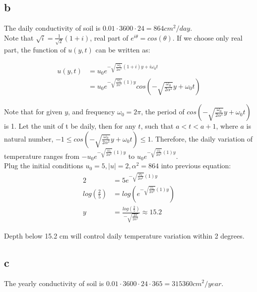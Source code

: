 \documentclass[11pt,letterpaper]{article}
\begin{document}
\subsection*{b}
\noindent The daily conductivity of soil is $0.01 \cdot 3600 \cdot 24 = 864 cm^2/day$. \\

\noindent Note that $\sqrt{i} = \frac{1}{\sqrt{2}} (1 + i)$, real part of $e^{i \theta} = cos(\theta)$. If we choose only real part, the function of $u(y,t)$ can be written as:

\begin{align*}
u(y, t) &= u_0 e^{- \sqrt{\frac{\omega_0}{2 \alpha^2}}(1 + i)y + i \omega_0 t} \\
&= u_0 e^{- \sqrt{\frac{\omega_0}{2 \alpha^2}}(1)y} cos(- \sqrt{\frac{\omega_0}{2 \alpha^2}} y + \omega_0 t)
\end{align*}

\noindent Note that for given $y$, and frequency $\omega_0 = 2 \pi$, the period of $cos(- \sqrt{\frac{\omega_0}{2 \alpha^2}} y + \omega_0 t)$ is 1. Let the unit of t be daily, then for any $t$, such that $a < t < a+1$, where $a$ is natural number, $-1 \leq cos(- \sqrt{\frac{\omega_0}{2 \alpha^2}} y + \omega_0 t) \leq 1$. Therefore, the daily variation of temperature ranges from $- u_0 e^{- \sqrt{\frac{\omega_0}{2 \alpha^2}}(1)y}$ to $u_0 e^{- \sqrt{\frac{\omega_0}{2 \alpha^2}}(1)y} $. \\

\noindent Plug the initial conditions $u_0=5, |u| = 2, \alpha^2 = 864$ into previous equation:
\begin{align*}
2 &= 5 e^{- \sqrt{\frac{\omega_0}{2 \alpha^2}}(1)y} \\
log(\frac{2}{5}) &= log(e^{- \sqrt{\frac{\omega_0}{2 \alpha^2}}(1)y} ) \\
y &= \frac{log(\frac{2}{5})}{-\sqrt{\frac{2 \pi}{2 \alpha^2}}} \approx 15.2
\end{align*}

\noindent Depth below 15.2 cm will control daily temperature variation within 2 degrees. \\



\subsection*{c}
\noindent The yearly conductivity of soil is $0.01 \cdot 3600 \cdot 24 \cdot 365 = 315360 cm^2/year$. \\
\end{document}
